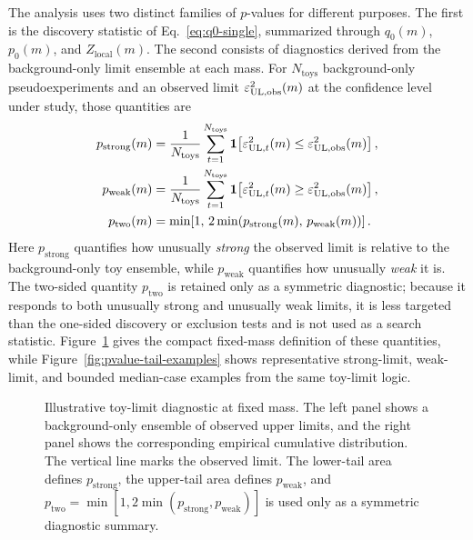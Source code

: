 The analysis uses two distinct families of $p$-values for different purposes. The
first is the discovery statistic of
Eq.~\eqref{eq:q0-single}, summarized through $q_0(m)$, $p_0(m)$, and
$Z_{\mathrm{local}}(m)$. The second consists of diagnostics
derived from the background-only \CLs{} limit ensemble at each mass. For
$N_{\mathrm{toys}}$ background-only pseudoexperiments and an observed limit
$\varepsilon^2_{\mathrm{UL},\mathrm{obs}}(m)$ at the confidence level under study, those
quantities are
\begin{align}
p_{\mathrm{strong}}(m)
&=
\frac{1}{N_{\mathrm{toys}}}
\sum_{t=1}^{N_{\mathrm{toys}}}
\mathbf{1}\!\left[
\varepsilon^2_{\mathrm{UL},t}(m)\le \varepsilon^2_{\mathrm{UL},\mathrm{obs}}(m)
\right], \\
p_{\mathrm{weak}}(m)
&=
\frac{1}{N_{\mathrm{toys}}}
\sum_{t=1}^{N_{\mathrm{toys}}}
\mathbf{1}\!\left[
\varepsilon^2_{\mathrm{UL},t}(m)\ge \varepsilon^2_{\mathrm{UL},\mathrm{obs}}(m)
\right], \\
p_{\mathrm{two}}(m)
&=
\min\!\left[1,\,
2\min\!\left(p_{\mathrm{strong}}(m),\,p_{\mathrm{weak}}(m)\right)\right].
\end{align}
Here $p_{\mathrm{strong}}$ quantifies how unusually \emph{strong} the observed limit
is relative to the background-only toy ensemble, while $p_{\mathrm{weak}}$ quantifies
how unusually \emph{weak} it is. The two-sided quantity $p_{\mathrm{two}}$ is retained
only as a symmetric diagnostic; because it responds to both unusually strong
and unusually weak limits, it is less targeted than the one-sided discovery or
exclusion tests and is not used as a search statistic. Figure~\ref{fig:pvalue-tail-schematic}
gives the compact fixed-mass definition of these quantities, while
Figure~\ref{fig:pvalue-tail-examples} shows representative strong-limit, weak-limit,
and bounded median-case examples from the same toy-limit logic.

\begin{figure}[H]
\centering
{}
\caption{Illustrative toy-limit diagnostic at fixed mass. The left panel shows a
background-only ensemble of observed \CLs{} upper limits, and the right panel shows the
corresponding empirical cumulative distribution. The vertical line marks the observed
limit. The lower-tail area defines $p_{\mathrm{strong}}$, the upper-tail area defines
$p_{\mathrm{weak}}$, and
$p_{\mathrm{two}}=\min[1,2\min(p_{\mathrm{strong}},p_{\mathrm{weak}})]$ is used only
as a symmetric diagnostic summary.}
\label{fig:pvalue-tail-schematic}
\end{figure}

